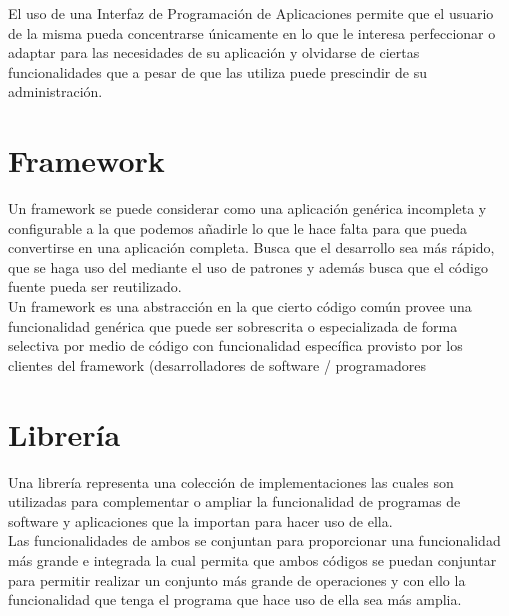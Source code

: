 El uso de una Interfaz de Programación de Aplicaciones permite que el usuario de la misma pueda concentrarse únicamente en lo que le interesa perfeccionar o adaptar para las necesidades de su aplicación y olvidarse de ciertas funcionalidades que a pesar de que las utiliza puede prescindir de su administración.\\ 
\section{Framework}
Un framework se puede considerar como una aplicación genérica incompleta y configurable a la que podemos añadirle lo que le hace falta para que pueda convertirse en una aplicación completa.\cite{Framework}
Busca que el desarrollo sea más rápido, que se haga uso del mediante el uso de patrones y además busca que el código fuente pueda ser reutilizado.\\ 

Un framework es una abstracción en la que cierto código común provee una funcionalidad genérica que puede ser sobrescrita o especializada de forma selectiva por medio de código con funcionalidad específica provisto por los clientes del framework (desarrolladores de software / programadores
 \cite{componentes}
\section{Librería}
Una librería representa una colección de implementaciones las cuales son utilizadas para complementar o ampliar la funcionalidad de programas de software y aplicaciones que la importan para hacer uso de ella.
\\ \cite{compo}
Las funcionalidades de ambos se conjuntan para proporcionar una funcionalidad más grande e integrada la cual permita que ambos códigos se puedan conjuntar para permitir realizar un conjunto más grande de operaciones y con ello la funcionalidad que tenga el programa que hace uso de ella sea más amplia.\\ 
